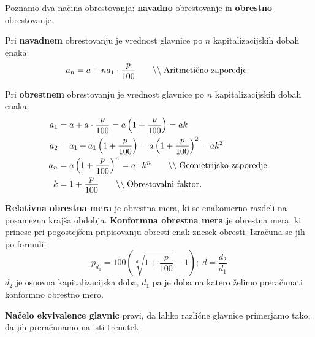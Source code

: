 \documentclass[a4paper,oneside,12pt,fleqn]{article}
\newcommand\krat\cdot
\newcommand{\comment}[1]{\ensuremath{\qquad\backslash\backslash\;}\textnormal{#1}}
\numberwithin{equation}{section}
\begin{document}
Poznamo dva načina obrestovanja: \textbf{navadno} obrestovanje in \textbf{obrestno} obrestovanje.

Pri \textbf{navadnem} obrestovanju je vrednost glavnice po $n$ kapitalizacijskih dobah enaka:
\[ a_n = a + na_1\krat \frac{p}{100} \comment{Aritmetično zaporedje. } \]

Pri \textbf{obrestnem} obrestovanju je vrednost glavnice po $n$ kapitalizacijskih dobah enaka:
\begin{align*}
  a_1 &= a + a\krat \frac{p}{100} = a\left(1 + \frac{p}{100}\right) = ak \\
  a_2 &= a_1 + a_1\left( 1+\frac{p}{100} \right) = a\left(1+\frac{p}{100}\right)^2 = ak^2  \\
  a_n &= a\left( 1+\frac{p}{100} \right)^n = a\krat k^n \comment{Geometrijsko zaporedje.} \\
  k &= 1+\frac{p}{100} \comment{Obrestovalni faktor.}
\end{align*}

\textbf{Relativna obrestna mera} je obrestna mera, ki se enakomerno razdeli na posamezna
krajša obdobja.
\textbf{Konformna obrestna mera} je obrestna mera, ki prinese pri pogostejšem pripisovanju
obresti enak znesek obresti. Izračuna se jih po formuli:
\[ p_{d_1} = 100\left( \sqrt[d]{1+\frac{p}{100}} - 1 \right) ; \; d = \frac{d_2}{d_1} \]
$d_2$ je osnovna kapitalizacijska doba, $d_1$ pa je doba na katero želimo preračunati
konformno obrestno mero. 

\textbf{Načelo ekvivalence glavnic} pravi, da lahko različne glavnice primerjamo tako, da
jih preračunamo na isti trenutek.
\end{document}

